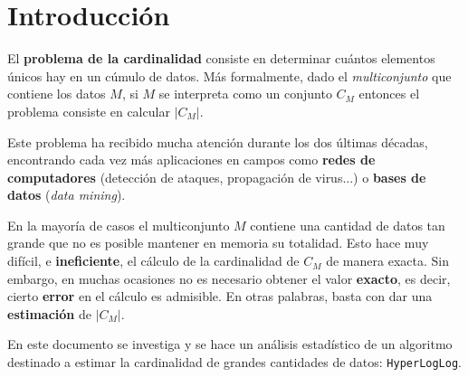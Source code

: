 % 
\section{Introducción}

El \textbf{problema de la cardinalidad} consiste en determinar cuántos elementos únicos hay en un cúmulo de
datos. Más formalmente, dado el \emph{multiconjunto} que contiene los datos $M$, si $M$ se interpreta como
un conjunto $C_M$ entonces el problema consiste en calcular $|C_M|$.

Este problema ha recibido mucha atención durante los dos últimas décadas, encontrando cada vez más
aplicaciones en campos como \textbf{redes de computadores} (detección de ataques, propagación de virus...) o
\textbf{bases de datos} (\emph{data mining}).

En la mayoría de casos el multiconjunto $M$ contiene una cantidad de datos tan grande que no es
posible mantener en memoria su totalidad. Esto hace muy difícil, e \textbf{ineficiente}, el cálculo de la
cardinalidad de $C_M$ de manera exacta. Sin embargo, en muchas ocasiones no es necesario obtener el valor
\textbf{exacto}, es decir, cierto \textbf{error} en el cálculo es admisible. En otras palabras, basta con dar una
\textbf{estimación} de $|C_M|$.

En este documento se investiga y se hace un análisis estadístico de un algoritmo destinado a estimar la
cardinalidad de grandes cantidades de datos: \texttt{HyperLogLog}.
